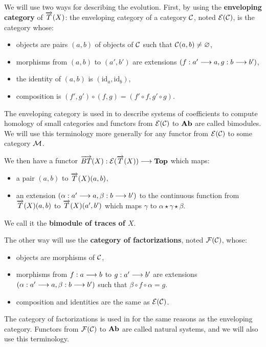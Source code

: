 We will use two ways for describing the evolution. First, by using the \textbf{enveloping category} of $\overrightarrow{T}(X)$: the enveloping category of a category $\mathcal{C}$, noted $\mathcal{E}(\mathcal{C})$, is the category whose:
\begin{itemize}
	\item objects are pairs $(a,b)$ of objects of $\mathcal{C}$ such that $\mathcal{C}(a,b) \neq \varnothing$,
	\item morphisms from $(a,b)$ to $(a',b')$ are extensions $(f : a' \longrightarrow a,g : b \longrightarrow b')$,
	\item the identity of $(a,b)$ is $(\text{id}_a,\text{id}_b)$,
	\item composition is $(f',g')\circ(f,g) = (f'\circ f,g'\circ g)$.
\end{itemize}
The enveloping category is used in \cite{mitchell72} to describe systems of coefficients to compute homology of small categories and functors from $\mathcal{E}(\mathcal{C})$ to $\textbf{Ab}$ are called bimodules. We will use this terminology more generally for any functor from $\mathcal{E}(\mathcal{C})$ to some category $\mathcal{M}$.

We then have a functor $\overrightarrow{BT}(X) : \mathcal{E}(\overrightarrow{T}(X)) \longrightarrow \textbf{Top}$ which maps:
\begin{itemize}
	\item a pair $(a,b)$ to $\overrightarrow{T}(X)(a,b)$,
	\item an extension $(\alpha : a' \longrightarrow a,\beta : b \longrightarrow b')$ to the continuous function from $\overrightarrow{T}(X)(a,b)$ to $\overrightarrow{T}(X)(a',b')$ which maps $\gamma$ to $\alpha\star\gamma\star\beta$.
\end{itemize}
We call it the \textbf{bimodule of traces of $X$}.

The other way will use the \textbf{category of factorizations}, noted $\mathcal{F}(\mathcal{C})$, whose:
\begin{itemize}
	\item objects are morphisms of $\mathcal{C}$,
	\item morphisms from $f : a \longrightarrow b$ to $g : a' \longrightarrow b'$ are extensions $(\alpha : a' \longrightarrow a,\beta : b \longrightarrow b')$ such that $\beta\circ f\circ \alpha = g$.
	\item composition and identities are the same as $\mathcal{E}(\mathcal{C})$.
\end{itemize}
The category of factorizations is used in \cite{baues85} for the same reasons as the enveloping category. Functors from $\mathcal{F}(\mathcal{C})$ to $\textbf{Ab}$ are called natural systems, and we will also use this terminology.

